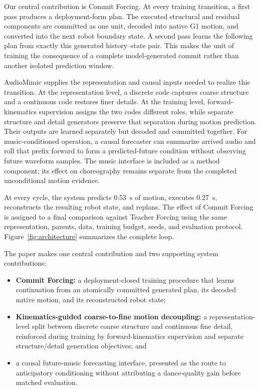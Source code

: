 \documentclass[conference]{IEEEtran}
\newcommand{\method}{AudioMimic}
\newcommand{\cof}{Commit Forcing}
\begin{document}
Our central contribution is \cof{}. At every training transition, a first pass produces a deployment-form plan. The executed structural and residual components are committed as one unit, decoded into native G1 motion, and converted into the next robot boundary state. A second pass learns the following plan from exactly this generated history--state pair. This makes the unit of training the consequence of a complete model-generated commit rather than another isolated prediction window.

\method{} supplies the representation and causal inputs needed to realize this transition. At the representation level, a discrete code captures coarse structure and a continuous code restores finer details. At the training level, forward-kinematics supervision assigns the two codes different roles, while separate structure and detail generators preserve that separation during motion prediction. Their outputs are learned separately but decoded and committed together. For music-conditioned operation, a causal forecaster can summarize arrived audio and roll that prefix forward to form a predicted-future condition without observing future waveform samples. The music interface is included as a method component; its effect on choreography remains separate from the completed unconditional motion evidence.

At every cycle, the system predicts 0.53~s of motion, executes 0.27~s, reconstructs the resulting robot state, and replans. The effect of \cof{} is assigned to a final comparison against Teacher Forcing using the same representation, parents, data, training budget, seeds, and evaluation protocol. Figure~\ref{fig:architecture} summarizes the complete loop.

The paper makes one central contribution and two supporting system contributions:
\begin{itemize}
    \item \textbf{Commit Forcing:} a deployment-closed training procedure that learns continuation from an atomically committed generated plan, its decoded native motion, and its reconstructed robot state;
    \item \textbf{Kinematics-guided coarse-to-fine motion decoupling:} a representation-level split between discrete coarse structure and continuous fine detail, reinforced during training by forward-kinematics supervision and separate structure/detail generation objectives; and
    \item a causal future-music forecasting interface, presented as the route to anticipatory conditioning without attributing a dance-quality gain before matched evaluation.
\end{itemize}
\end{document}
